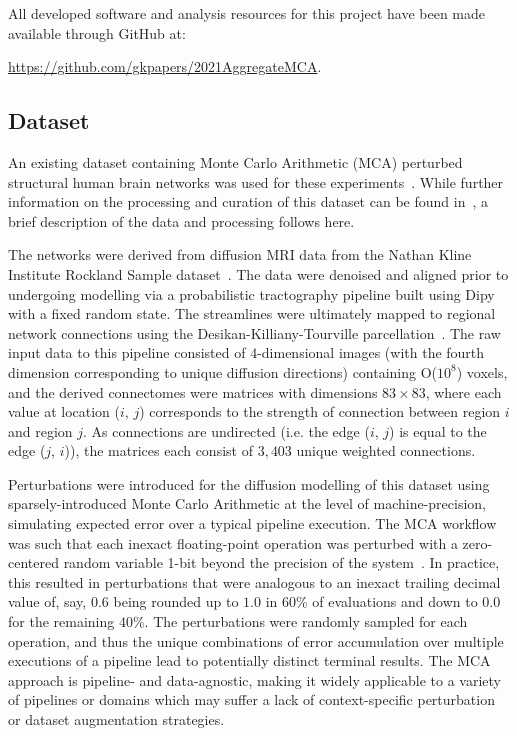 \documentclass[num-refs]{nbdt-article}
\begin{document}
\noindent All developed software and analysis resources for this project have been made available through GitHub at:

\url{https://github.com/gkpapers/2021AggregateMCA}.

\subsection{Dataset}
An existing dataset containing Monte Carlo Arithmetic (MCA) perturbed structural human brain networks was used for these experiments~\cite{Kiar2020-yz}. While further information on the processing and curation of this dataset can be found in~\cite{Kiar2020-kz}, a brief description of the data and processing follows here.

The networks were derived from diffusion MRI data from the Nathan Kline Institute Rockland Sample
dataset~\cite{zuo2014open}. The data were denoised and aligned prior to undergoing modelling via a probabilistic tractography pipeline built using Dipy~\cite{Garyfallidis2014-ql} with a fixed random state. The streamlines were ultimately mapped to regional network connections using the Desikan-Killiany-Tourville parcellation~\cite{Klein2012-vi}. The raw input data to this pipeline consisted of $4$-dimensional images (with the fourth dimension corresponding to unique diffusion directions) containing O($10^8$) voxels, and the derived connectomes were matrices with dimensions $83 \times 83$, where each value at location ($i$, $j$) corresponds to the strength of connection between region $i$ and region $j$. As connections are undirected (i.e. the edge ($i$, $j$) is equal to the edge ($j$, $i$)), the matrices each consist of $3,403$ unique weighted connections.

Perturbations were introduced for the diffusion modelling of this dataset using sparsely-introduced Monte Carlo Arithmetic at the level of machine-precision, simulating expected error over a typical pipeline execution. The MCA workflow was such that each inexact floating-point operation was perturbed with a zero-centered random variable 1-bit beyond the precision of the system~\cite{Denis2016-wo,Parker1997-qq}. In practice, this resulted in perturbations that were analogous to an inexact trailing decimal value of, say, $0.6$ being rounded up to $1.0$ in $60\%$ of evaluations and down to $0.0$ for the remaining $40\%$. The perturbations were randomly sampled for each operation, and thus the unique combinations of error accumulation over multiple executions of a pipeline lead to potentially distinct terminal results. The MCA approach is pipeline- and data-agnostic, making it widely applicable to a variety of pipelines or domains which may suffer a lack of context-specific perturbation or dataset augmentation strategies.
\end{document}
